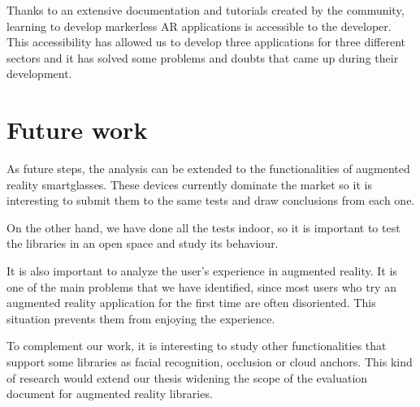 Thanks to an extensive documentation and tutorials created by the community, learning to develop markerless AR applications is accessible to the developer. This accessibility has allowed us to develop three applications for three different sectors and it has solved some problems and doubts that came up during their development.

\section{Future work}

As future steps, the analysis can be extended to the functionalities of augmented reality smartglasses. These devices currently dominate the market so  it is interesting to submit them to the same tests and draw conclusions from each one.

On the other hand, we have done all the tests indoor, so it is important to test the libraries in an open space and study its behaviour.

It is also important to analyze the user's experience in augmented reality. It is one of the main problems that we have identified, since most users who try an augmented reality application for the first time are often disoriented. This situation prevents them from enjoying the experience.

To complement our work, it is interesting to study other functionalities that support some libraries as facial recognition, occlusion or cloud anchors. This kind of research would extend our thesis widening the scope of the  evaluation document for augmented reality libraries.
\noindent